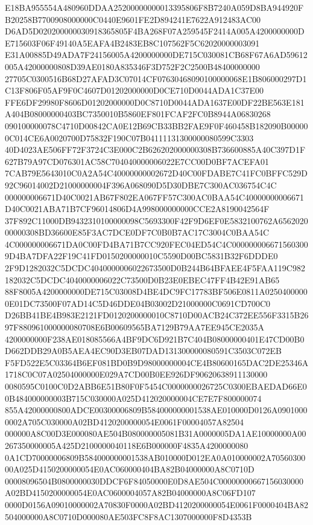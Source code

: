 \documentclass[UTF8,fontset=fandol,zihao=-4,a4paper]{ctexart}
\begin{document}
{{E18BA955554A480960DDAA25200000000013395806F8B7240A059D8BA944920FB20258B7700908000000C0440E9601FE2D894241E7622A912483AC00
D6AD5D020200000030918365805F4BA268F07A259545F2414A005A4200000000DE715603F06F49140A5EAFA4B2483EB8C107562F5C62020000003091
E31A00885D49ADA7F24156005A4200000000DE715C030081CB68F67A6AD59612005A42000000808D39AE0180A835346F3D752F2C2500B48400000000
27705C0300516B68D27AFAD3C07014CF07630468090100000068E1B806000297D1C13F806F05AF9F0C4607D01202000000D0CE710D0044ADA1C37E00
FFE6DF29980F8606D01202000000D0C8710D0044ADA1637E00DF22BE563E181A404B08000000403BC7350010B5860EF801FCAF2FC0B8944A06830268
090100000078C4710D00842CA0E12B69CB33BB2FAE9F0F460458B182090B000000C014CE6A0020700D75832F190C07B04111131300000080599C3303
40D4023AE506FF72F3724C3E000C2B626202000000308B736600885A40C397D1F627B79A97CD076301AC58C704040000006022E7CC00D0BF7ACEFA01
7CAB79E5643010C0A2A54C40000000002672D40C00FDABE7C41FC0BFFC529D92C96014002D21000000004F396A068090D5D30DBE7C300AC036754C4C
000000006671D40C0021AB67F802EA067FF57C300AC0BAA54C40000000006671D40C0021ABA71B7CF96014806D4A998000000000CCE2A8190042564F
37F892C11000DB9432310100000098C5693300F42F9D6EF0E5832100762A656202000000308BD36600E85F3AC7DCE0DF7C0B0B7AC17C3004C0BAA54C
4C000000006671DA0C00FD4BA71B7CC920FEC04ED54C4C0000000066715603009D4BA7DFA22F19C41FD0150200000010C5590D00BC5831B32F6DDDE0
2F9D1282032C5DCDC4040000006022673500D0B244B64BFAEE4F5FAA119C982182032C5DCDC4040000006022C73500D0B23E0EBEC47FF4B42E91AB65
88F8005A4200000000DE715C03008D4BE4DC9FC17783BF506E0811A02504000000E01DC73500F07AD14C5D46DDE04B03002D21000000C0691CD700C0
D26BB41BE4B983E2121FD0120200000010C8710D00ACB24C372EE556F3315B2697F880961000000080708E6B00609565BA7129B79AA7EE945CE2035A
4200000000F238AE018085566A4BF9DC6D921B7C404B08000000401E47CD00B0D662DDB29A0B5AEA4EC90D3EB07DAD131300000080591C3503C072EB
F5FD522E5C03364B6EF081BD0B9D98000000004CE4B80600165DAC2DE25346A1718C0C07A02504000000E029A7CD00B0EE926DF90620638911130000
0080595C0100C0D2ABB6E51B80F0F5454C0000000026725C0300EBAEDAD66E00B484000000003B715C030000A025D412020000004CE7E7F800000074
855A42000000800ADCE00300006809B584000000001538AE010000D0126A09010000002A705C030000A02BD4120200000054E0061F00004057A82504
000000A8C00D3E000080AE504B080000005081B31A0000005DA1AE10000000A00267350000005A425D2100000040118E6B000000F4835A4200000080
0A1CD70000006809B584000000001538AB010000D012EA0A010000002A7056030000A025D4150200000054E0AC060000404BA82B04000000A8C0710D
00008096504B0800000030DDCF6F84050000E0D8AE504C00000000667156030000A02BD4150200000054E0AC0600004057A82B04000000A8C06FD107
0000D0156A09010000002A70830F0000A02BD4120200000054E0061F0000404BA82504000000A8C0710D000080AE503FC8F8AC1307000000F8D4353B
}}
\end{document}
